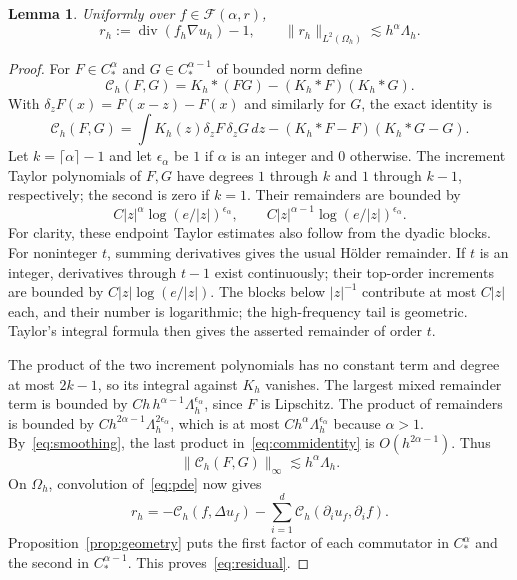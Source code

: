 \documentclass[11pt]{article}
\newtheorem{lemma}[theorem]{Lemma}
\theoremstyle{remark}
\newcommand{\cF}{\mathcal F}
\newcommand{\diver}{\operatorname{div}}
\newcommand{\norm}[1]{\lVert #1\rVert}
\newcommand{\abs}[1]{\lvert #1\rvert}
\begin{document}
\begin{lemma}\label{lem:residual}
Uniformly over $f\in\cF(\alpha,r)$,
\begin{equation}\label{eq:residual}
 r_h:=\diver(f_h\nabla u_h)-1,
 \qquad \norm{r_h}_{L^2(\Omega_h)}\lesssim h^\alpha\Lambda_h.
\end{equation}
\end{lemma}
\begin{proof}
For $F\in C_*^\alpha$ and $G\in C_*^{\alpha-1}$ of bounded norm define
\[
 \mathcal C_h(F,G)=K_h*(FG)-(K_h*F)(K_h*G).
\]
With $\delta_zF(x)=F(x-z)-F(x)$ and similarly for $G$, the exact identity is
\begin{equation}\label{eq:commidentity}
 \mathcal C_h(F,G)=\int K_h(z)\delta_zF\,\delta_zG\,dz
 -(K_h*F-F)(K_h*G-G).
\end{equation}
Let $k=\lceil\alpha\rceil-1$ and let $\epsilon_\alpha$ be $1$ if $\alpha$ is an integer and $0$ otherwise. The increment Taylor polynomials of $F,G$ have degrees $1$ through $k$ and $1$ through $k-1$, respectively; the second is zero if $k=1$. Their remainders are bounded by
\[
 C\abs{z}^\alpha\log(e/\abs{z})^{\epsilon_\alpha},
 \qquad C\abs{z}^{\alpha-1}\log(e/\abs{z})^{\epsilon_\alpha}.
\]
For clarity, these endpoint Taylor estimates also follow from the dyadic blocks. For noninteger $t$, summing derivatives gives the usual H\"older remainder. If $t$ is an integer, derivatives through $t-1$ exist continuously; their top-order increments are bounded by $C\abs{z}\log(e/\abs{z})$. The blocks below $\abs{z}^{-1}$ contribute at most $C\abs{z}$ each, and their number is logarithmic; the high-frequency tail is geometric. Taylor's integral formula then gives the asserted remainder of order $t$.


The product of the two increment polynomials has no constant term and degree at most $2k-1$, so its integral against $K_h$ vanishes. The largest mixed remainder term is bounded by $Ch\,h^{\alpha-1}\Lambda_h^{\epsilon_\alpha}$, since $F$ is Lipschitz. The product of remainders is bounded by $Ch^{2\alpha-1}\Lambda_h^{2\epsilon_\alpha}$, which is at most $Ch^\alpha\Lambda_h^{\epsilon_\alpha}$ because $\alpha>1$. By~\eqref{eq:smoothing}, the last product in~\eqref{eq:commidentity} is $O(h^{2\alpha-1})$. Thus
\begin{equation}\label{eq:commbound}
 \norm{\mathcal C_h(F,G)}_\infty\lesssim h^\alpha\Lambda_h.
\end{equation}
On $\Omega_h$, convolution of~\eqref{eq:pde} now gives
\[
 r_h=-\mathcal C_h(f,\Delta u_f)
      -\sum_{i=1}^d\mathcal C_h(\partial_i u_f,\partial_i f).
\]
Proposition~\ref{prop:geometry} puts the first factor of each commutator in $C_*^\alpha$ and the second in $C_*^{\alpha-1}$. This proves~\eqref{eq:residual}.
\end{proof}
\end{document}
